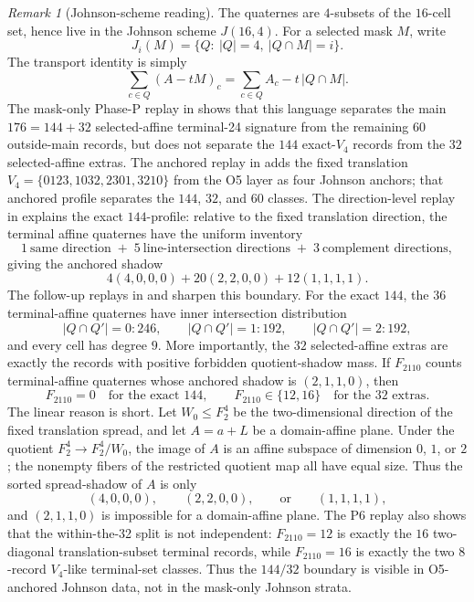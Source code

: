 \documentclass[11pt,a4paper]{article}
\theoremstyle{definition}
\theoremstyle{remark}
\newtheorem{remark}[theorem]{Remark}
\begin{document}
\begin{remark}[Johnson-scheme reading]
The quaternes are \(4\)-subsets of the \(16\)-cell set, hence live in the
Johnson scheme \(J(16,4)\).  For a selected mask \(M\), write
\[
J_i(M)=\{Q:\ |Q|=4,\ |Q\cap M|=i\}.
\]
The transport identity is simply
\[
\sum_{c\in Q}(A-tM)_c=\sum_{c\in Q}A_c-t\,|Q\cap M|.
\]
The mask-only Phase-P replay in
 shows that this language
separates the main \(176=144+32\) selected-affine terminal-24 signature from
the remaining \(60\) outside-main records, but does not separate the \(144\)
exact-\(V_4\) records from the \(32\) selected-affine extras.  The anchored
replay in  adds the fixed
translation \(V_4=\{0123,1032,2301,3210\}\) from the O5 layer as four
Johnson anchors; that anchored profile separates the \(144\), \(32\), and
\(60\) classes.  The direction-level replay in
 explains the exact
\(144\)-profile: relative to the fixed translation direction, the terminal
affine quaternes have the uniform inventory
\[
  1\ \text{same direction} \;+\; 5\ \text{line-intersection directions}
  \;+\; 3\ \text{complement directions},
\]
giving the anchored shadow
\[
  4(4,0,0,0)+20(2,2,0,0)+12(1,1,1,1).
\]
The follow-up replays in  and
 sharpen this boundary.
For the exact \(144\), the \(36\) terminal-affine quaternes have inner
intersection distribution
\[
  |Q\cap Q'|=0:246,\qquad |Q\cap Q'|=1:192,\qquad |Q\cap Q'|=2:192,
\]
and every cell has degree \(9\).  More importantly, the \(32\)
selected-affine extras are exactly the records with positive forbidden
quotient-shadow mass.  If \(F_{2110}\) counts terminal-affine quaternes whose
anchored shadow is \((2,1,1,0)\), then
\[
  F_{2110}=0 \quad\text{for the exact }144,\qquad
  F_{2110}\in\{12,16\} \quad\text{for the }32\text{ extras}.
\]
The linear reason is short.  Let \(W_0\le F_2^4\) be the two-dimensional
direction of the fixed translation spread, and let \(A=a+L\) be a
domain-affine plane.  Under the quotient \(F_2^4\to F_2^4/W_0\), the image of
\(A\) is an affine subspace of dimension \(0\), \(1\), or \(2\); the nonempty
fibers of the restricted quotient map all have equal size.  Thus the sorted
spread-shadow of \(A\) is only
\[
  (4,0,0,0),\qquad (2,2,0,0),\qquad \text{or}\qquad (1,1,1,1),
\]
and \((2,1,1,0)\) is impossible for a domain-affine plane.  The P6 replay
 also shows that the
within-the-32 split is not independent: \(F_{2110}=12\) is exactly the
\(16\) two-diagonal translation-subset terminal records, while \(F_{2110}=16\)
is exactly the two \(8\)-record \(V_4\)-like terminal-set classes.  Thus the
\(144/32\) boundary is visible in O5-anchored Johnson data, not in the
mask-only Johnson strata.
\end{remark}
\end{document}
